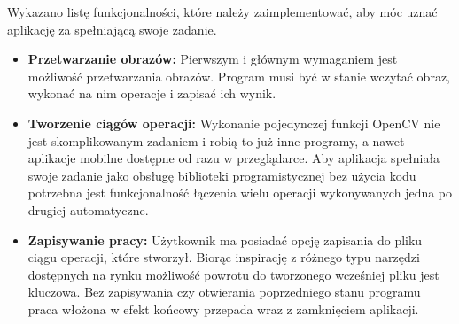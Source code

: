 Wykazano listę funkcjonalności, które należy zaimplementować, aby móc uznać aplikację za spełniającą swoje zadanie. 

\begin{itemize}
    \item \textbf{Przetwarzanie obrazów:} Pierwszym i głównym wymaganiem jest możliwość przetwarzania obrazów. Program musi być w stanie wczytać obraz, wykonać na nim operacje i zapisać ich wynik.
    \item \textbf{Tworzenie ciągów operacji:} Wykonanie pojedynczej funkcji OpenCV nie jest skomplikowanym zadaniem i robią to już inne programy, a nawet aplikacje mobilne dostępne od razu w przeglądarce. Aby aplikacja spełniała swoje zadanie jako obsługę biblioteki programistycznej bez użycia kodu potrzebna jest funkcjonalność łączenia wielu operacji wykonywanych jedna po drugiej automatyczne.
    \item \textbf{Zapisywanie pracy:} Użytkownik ma posiadać opcję zapisania do pliku ciągu operacji, które stworzył. Biorąc inspirację z różnego typu narzędzi dostępnych na rynku \cite{designer,photoshop} możliwość powrotu do tworzonego wcześniej pliku jest kluczowa. Bez zapisywania czy otwierania poprzedniego stanu programu praca włożona w efekt końcowy przepada wraz z zamknięciem aplikacji.
\end{itemize}